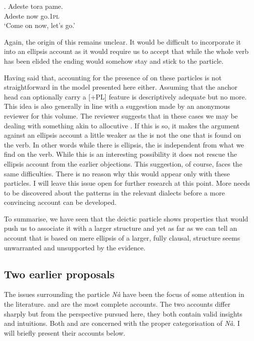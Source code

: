 \documentclass[output=paper]{LSP/langsci}
\begin{document}
\exg.
Adeste tora pame.\\
Adeste now go.1\textsc{pl}\\
\glt `Come on now, let's go.'

Again, the origin of this  remains unclear.  It would be difficult to incorporate it into an ellipsis account as it would require us to accept that while the whole verb has been elided the  ending would somehow stay and stick to the particle.

Having said that, accounting for the presence of  on these particles is not straightforward in the model presented here either.  Assuming that the anchor head can optionally carry a [+PL] feature is descriptively adequate but no more.  This idea is also generally in line with a suggestion made by an anonymous reviewer for this volume.  The reviewer suggests that in these cases we may be dealing with something akin to allocutive .  If this is so, it makes the argument against an ellipsis account a little weaker as the  is not the one that is found on the verb.  In other words while there is ellipsis, the  is independent from what we find on the verb.  While this is an interesting possibility it does not rescue the ellipsis account from the earlier objections.  This suggestion, of course, faces the same difficulties.  There is no reason why this  would appear only with these particles.  I will leave this issue open for further research at this point.  More needs to be discovered about the  patterns in the relevant dialects before a more convincing account can be developed.


To summarise, we have seen that the deictic particle shows properties that would push us to associate it with a larger structure and yet as far as we can tell an account that is based on mere ellipsis of a larger, fully clausal, structure seems unwarranted and unsupported by the evidence. 

\subsection{Two earlier proposals} \label{sec:lit}
The issues surrounding the  particle \textit{N\`{a}} have been the focus of some attention in the literature. \citet{joseph:81} and \citet{christidis:90} are the most complete accounts. The two accounts differ sharply but from the perspective pursued here, they both contain valid insights and intuitions. Both \citet{joseph:81} and \citet{christidis:90} are concerned with the proper categorisation of \textit{N\`{a}}.   I will briefly present their accounts below.
\end{document}
